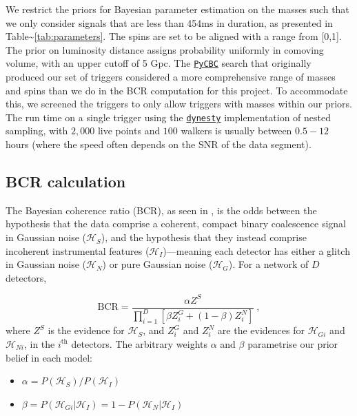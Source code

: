 \documentclass[%
 reprint,
 amsmath,amssymb,
 aps,
]{revtex4}
\begin{document}
We restrict the priors for Bayesian parameter estimation on the masses such that we only consider signals that are less
than 454ms in duration, as presented in Table\textasciitilde\ref{tab:parameters}. The spins are set to be aligned with a range from
{[}0,1{]}. The prior on luminosity distance assigns probability uniformly in comoving volume, with an upper cutoff of 5 Gpc.
The \href{https://pycbc.org/}{\texttt{PyCBC}} search that originally produced our set of triggers considered a more comprehensive range of masses and
spins than we do in the BCR computation for this project. To accommodate this, we screened the triggers to only allow
triggers with masses within our priors. The run time on a single trigger using the \href{https://arxiv.org/abs/1904.02180}{\texttt{dynesty}} implementation of nested
sampling, with \(2,000\) live points and \(100\) walkers is usually between \(0.5-12\) hours (where the speed often depends on
the SNR of the data segment).

\hypertarget{bcrCalculation}{%
\subsection{BCR calculation}\label{bcrCalculation}}

The Bayesian coherence ratio (BCR), as seen in \citet{bcr_paper}, is the odds between the hypothesis that the data comprise a
coherent, compact binary coalescence signal in Gaussian noise (\(\mathcal{H}_S\)), and the hypothesis that they instead
comprise incoherent instrumental features (\(\mathcal{H}_I\))---meaning each detector has either a glitch in Gaussian noise
(\(\mathcal{H}_N\)) or pure Gaussian noise (\(\mathcal{H}_G\)). For a network of \(D\) detectors,

\begin{equation}
\mathrm{BCR} = \frac{\alpha Z^{S}}{\prod_{i=1}^{D}\left[\beta Z_{i}^{G}+(1-\beta) Z_{i}^{N}\right]}\ , \label{eq:bcr}
\end{equation}
where \(Z^S\) is the evidence for \(\mathcal{H}_S\), and \(Z^{G}_i\) and
\(Z^N_i\) are the evidences for \(\mathcal{H}_{Gi}\) and \(\mathcal{H}_{Ni}\),
in the \(i^{\text{th}}\) detectors. The arbitrary weights \(\alpha\) and \(\beta\)
parametrise our prior belief in each model:

\begin{itemize}
\item
  \(\alpha = P(\mathcal{H}_S)/P(\mathcal{H}_I)\)
\item
  \(\beta = P(\mathcal{H}_{Gi}|\mathcal{H}_I)=1-P(\mathcal{H}_{N}|\mathcal{H}_I)\)
\end{itemize}
\end{document}
